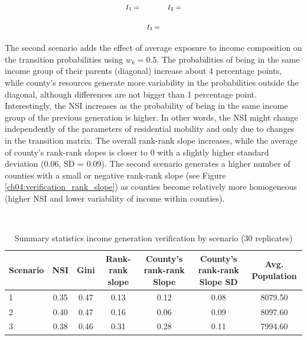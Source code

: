 \begin{center}
\begin{equation*}
\footnotesize
\label{ch04:verification_trans_mob}
\begin{aligned}
    I_1 = 

\end{aligned}
\qquad \qquad
\begin{aligned}
  I_2 = 

\end{aligned}
\end{equation*}
\end{center}

\begin{center}
\begin{equation*}
\footnotesize
\begin{aligned}
    I_3 = 

\end{aligned}
\end{equation*}
\end{center}


\vspace{5mm}
The second scenario adds the effect of average exposure to income composition on the transition probabilities using $w_k = 0.5$. The probabilities of being in the same income group of their parents (diagonal) increase about 4 percentage points, while county's resources generate more variability in the probabilities outside the diagonal, although differences are not bigger than 1 percentage point. Interestingly, the NSI increases as the probability of being in the same income group of the previous generation is higher. In other words, the NSI might change independently of the parameters of residential mobility and only due to changes in the transition matrix. The overall rank-rank slope increases, while the average of county's rank-rank slopes is closer to 0 with a slightly higher standard deviation (0.06, SD = 0.09). The second scenario generates a higher number of counties with a small or negative rank-rank slope (see Figure \ref{ch04:verification_rank_slope}) as counties become relatively more homogeneous (higher NSI and lower variability of income within counties). 

\vspace{5mm}
\begin{table}[htp]
\setlength{\tabcolsep}{5pt}
\centering
\footnotesize
\caption{Summary statistics income generation verification by scenario (30 replicates)}\
\label{ch04:verification_income_stats}
\begin{tabular}{lcccccc}
  \hline
Scenario & NSI & Gini & Rank-rank slope & County's rank-rank Slope & County's rank-rank Slope SD & Avg. Population \\
  \hline
  1 & 0.35 & 0.47 & 0.13 & 0.12 & 0.08 & 8079.50 \\
    2 & 0.40 & 0.47 & 0.16 & 0.06 & 0.09 & 8097.60 \\
    3 & 0.38 & 0.46 & 0.31 & 0.28 & 0.11 & 7994.60 \\
   \hline
\end{tabular}
\end{table}
\vspace{5mm}


